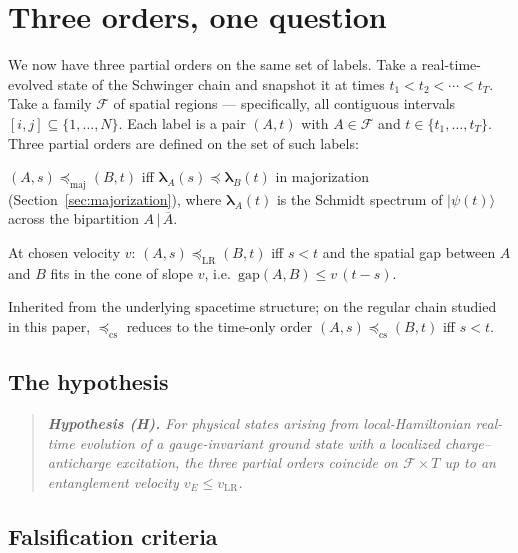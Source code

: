 \documentclass[11pt,a4paper]{article}
\theoremstyle{definition}
\theoremstyle{plain}
\theoremstyle{remark}
\newcommand{\ket}[1]{\lvert #1 \rangle}
\newcommand{\maj}{\mathrm{maj}}
\newcommand{\LR}{\mathrm{LR}}
\newcommand{\cs}{\mathrm{cs}}
\begin{document}
\section{Three orders, one question}\label{sec:three-orders}

We now have three partial orders on the same set of labels.  Take a
real-time-evolved state of the Schwinger chain and snapshot it at
times $t_1 < t_2 < \cdots < t_T$.  Take a family $\mathcal{F}$ of
spatial regions --- specifically, all contiguous intervals
$[i, j] \subseteq \{1, \ldots, N\}$.  Each label is a pair
$(A, t)$ with $A \in \mathcal{F}$ and $t \in \{t_1, \ldots, t_T\}$.
Three partial orders are defined on the set of such labels:

\begin{description}[leftmargin=2.5em,style=nextline]
\item[$\preceq_{\maj}$ (majorization order)]
  $(A, s) \preceq_{\maj} (B, t)$ iff
  $\bm{\lambda}_A(s) \preceq \bm{\lambda}_B(t)$
  in majorization (Section~\ref{sec:majorization}), where
  $\bm{\lambda}_A(t)$ is the Schmidt spectrum of $\ket{\psi(t)}$
  across the bipartition $A \,|\, \overline{A}$.
\item[$\preceq_{\LR}$ (Lieb--Robinson order)]
  At chosen velocity $v$:
  $(A, s) \preceq_{\LR} (B, t)$ iff $s < t$ and the spatial gap
  between $A$ and $B$ fits in the cone of slope $v$, i.e.\
  $\mathrm{gap}(A, B) \le v\,(t - s)$.
\item[$\preceq_{\cs}$ (causet order)]
  Inherited from the underlying spacetime structure; on the regular
  chain studied in this paper, $\preceq_{\cs}$ reduces to the
  time-only order $(A, s) \preceq_{\cs} (B, t)$ iff $s < t$.
\end{description}

\subsection{The hypothesis}

\begin{quote}\itshape
  \textbf{Hypothesis (H).}
  For physical states arising from local-Hamiltonian real-time
  evolution of a gauge-invariant ground state with a localized
  charge--anticharge excitation, the three partial orders coincide on
  $\mathcal{F} \times T$ up to an entanglement velocity
  $v_E \le v_{\LR}$.
\end{quote}

\subsection{Falsification criteria}
\end{document}
